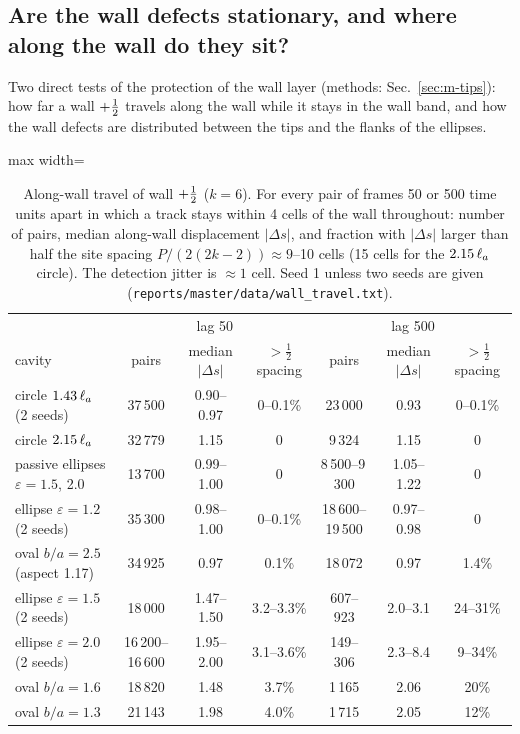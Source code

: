 \subsection{Are the wall defects stationary, and where along the wall do they sit?}\label{sec:stationary}
Two direct tests of the protection of the wall layer (methods: Sec.~\ref{sec:m-tips}): how far a wall $+\tfrac12$ travels along the
wall while it stays in the wall band, and how the wall defects are distributed between the tips and the flanks of the ellipses.
\begin{table}[H]\centering\small
\caption{Along-wall travel of wall $+\tfrac12$ ($k=6$). For every pair of frames 50 or 500 time units apart in which a track stays within
4 cells of the wall throughout: number of pairs, median along-wall displacement $|\Delta s|$, and fraction with $|\Delta s|$ larger than
half the site spacing $P/(2(2k-2))\approx9$--10 cells (15 cells for the $2.15\,\ell_a$ circle). The detection jitter is $\approx1$ cell.
Seed 1 unless two seeds are given (\texttt{reports/master/data/wall\_travel.txt}).}\label{tab:travel}
\begin{adjustbox}{max width=\textwidth}
\begin{tabular}{lcccccc}\toprule
& \multicolumn{3}{c}{lag 50} & \multicolumn{3}{c}{lag 500}\\
cavity & pairs & median $|\Delta s|$ & $>\frac12$ spacing & pairs & median $|\Delta s|$ & $>\frac12$ spacing\\\midrule
circle $1.43\,\ell_a$ (2 seeds) & 37\,500 & 0.90--0.97 & 0--0.1\% & 23\,000 & 0.93 & 0--0.1\%\\
circle $2.15\,\ell_a$ & 32\,779 & 1.15 & 0 & 9\,324 & 1.15 & 0\\
passive ellipses $\varepsilon=1.5$, 2.0 & 13\,700 & 0.99--1.00 & 0 & 8\,500--9\,300 & 1.05--1.22 & 0\\
ellipse $\varepsilon=1.2$ (2 seeds) & 35\,300 & 0.98--1.00 & 0--0.1\% & 18\,600--19\,500 & 0.97--0.98 & 0\\
oval $b/a=2.5$ (aspect 1.17) & 34\,925 & 0.97 & 0.1\% & 18\,072 & 0.97 & 1.4\%\\
ellipse $\varepsilon=1.5$ (2 seeds) & 18\,000 & 1.47--1.50 & 3.2--3.3\% & 607--923 & 2.0--3.1 & 24--31\%\\
ellipse $\varepsilon=2.0$ (2 seeds) & 16\,200--16\,600 & 1.95--2.00 & 3.1--3.6\% & 149--306 & 2.3--8.4 & 9--34\%\\
oval $b/a=1.6$ & 18\,820 & 1.48 & 3.7\% & 1\,165 & 2.06 & 20\%\\
oval $b/a=1.3$ & 21\,143 & 1.98 & 4.0\% & 1\,715 & 2.05 & 12\%\\\bottomrule
\end{tabular}
\end{adjustbox}
\end{table}
